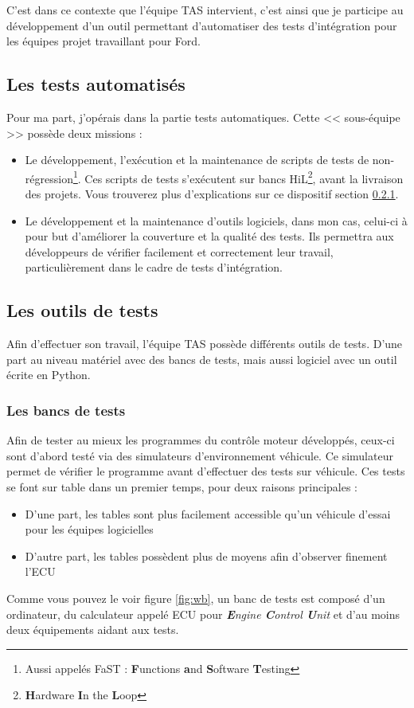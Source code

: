 C'est dans ce contexte que l'équipe TAS intervient, c'est ainsi que je participe au développement d'un outil permettant d'automatiser des tests d'intégration pour les équipes projet travaillant pour Ford.
 		\subsection{Les tests automatisés}

 		Pour ma part, j'opérais dans la partie tests automatiques. Cette << sous-équipe >> possède deux missions : 
 		\begin{itemize}
 			\item Le développement, l'exécution et la maintenance de scripts de tests de non-régression\footnote{Aussi appelés FaST : \textbf{F}unctions \textbf{a}nd \textbf{S}oftware \textbf{T}esting}. Ces scripts de tests s'exécutent sur bancs HiL\footnote{\textbf{H}ardware \textbf{I}n the \textbf{L}oop}, avant la livraison des projets. Vous trouverez plus d'explications sur ce dispositif section \ref{wb}. 
 			\item Le développement et la maintenance d'outils logiciels, dans mon cas, celui-ci à pour but d'améliorer la couverture et la qualité des tests. Ils permettra aux développeurs de vérifier facilement et correctement leur travail, particulièrement dans le cadre de tests d'intégration.
 		\end{itemize}
	\subsection{Les outils de tests}
	Afin d'effectuer son travail, l'équipe TAS possède différents outils de tests. D'une part au niveau matériel avec des bancs de tests, mais aussi logiciel avec un outil écrite en Python.
	
		\subsubsection{Les bancs de tests}\label{wb}
		Afin de tester au mieux les programmes du contrôle moteur développés, ceux-ci sont d'abord testé via des simulateurs d'environnement véhicule. Ce simulateur permet de vérifier le programme avant d'effectuer des tests sur véhicule. Ces tests se font sur table dans un premier temps, pour deux raisons principales : 
		\begin{itemize}
			\item D'une part, les tables sont plus facilement accessible qu'un véhicule d'essai pour les équipes logicielles
			\item D'autre part, les tables possèdent plus de moyens afin d'observer finement l'ECU
		\end{itemize}		
		Comme vous pouvez le voir figure \ref{fig:wb}, un banc de tests est composé d'un ordinateur, du calculateur appelé ECU pour \textit{\textbf{E}ngine \textbf{C}ontrol \textbf{U}nit} et d'au moins deux équipements aidant aux tests. 
		
